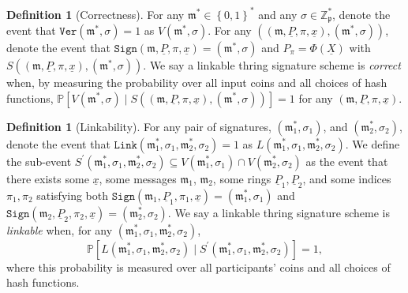 \documentclass{iacrtrans}
\theoremstyle{definition}
\numberwithin{theorem}{subsection}
\numberwithin{lemma}{theorem}
\newtheorem{defn}[theorem]{Definition}
\newcommand{\m}{\mathfrak{m}}
\begin{document}
\begin{defn}[Correctness]
For any $\m^* \in \left\{0,1\right\}^*$ and any $\sigma \in \mathbb{Z}_{\mathfrak{p}}^*$, denote the event that $\texttt{Ver}(\m^*, \sigma) = 1$ as $V(\m^*, \sigma)$. For any $((\m, \underline{P}, \pi, \underline{x}), (\m^*, \sigma))$, denote the event that $\texttt{Sign}(\m, \underline{P}, \pi, \underline{x}) = (\m^*, \sigma)$ and $P_\pi = \Phi(\underline{X})$ with $S\left((\m, \underline{P}, \pi, \underline{x}), (\m^*, \sigma)\right)$. We say a linkable thring signature scheme is \textit{correct} when, by measuring the probability over all input coins and all choices of hash functions, $\mathbb{P}\left[ V(\m^*, \sigma) \mid S\left((\m, \underline{P}, \pi, \underline{x}), (\m^*, \sigma)\right)\right] = 1$ for any $(\m, \underline{P}, \pi, \underline{x})$.
\end{defn}

\begin{defn}[Linkability]
For any pair of signatures, $(\m^*_1, \sigma_1)$, and $(\m^*_2, \sigma_2)$, denote the event that $\texttt{Link}(\m^*_1, \sigma_1, \m^*_2, \sigma_2) = 1$ as $L(\m^*_1, \sigma_1, \m^*_2, \sigma_2)$. We define the sub-event $S^{\prime}(\m^*_1, \sigma_1, \m^*_2, \sigma_2) \subseteq V(\m^*_1, \sigma_1) \cap V(\m^*_2, \sigma_2)$ as the event that there exists some $\underline{x}$, some messages $\m_1$, $\m_2$, some rings $\underline{P}_1, \underline{P}_2$, and some indices $\pi_1, \pi_2$ satisfying both  $\texttt{Sign}(\m_1, \underline{P}_1, \pi_1, \underline{x}) = (\m^*_1, \sigma_1)$ and $\texttt{Sign}(\m_2, \underline{P}_2, \pi_2, \underline{x}) = (\m^*_2, \sigma_2)$. We say a linkable thring signature scheme is \textit{linkable} when, for any $(\m^*_1, \sigma_1, \m^*_2, \sigma_2)$, \[\mathbb{P}\left[L(\m^*_1, \sigma_1, \m^*_2, \sigma_2)\mid S^{\prime}(\m^*_1, \sigma_1, \m^*_2, \sigma_2)\right] = 1,\] where this probability is measured over all participants' coins and all choices of hash functions.
\end{defn} 
\end{document}
